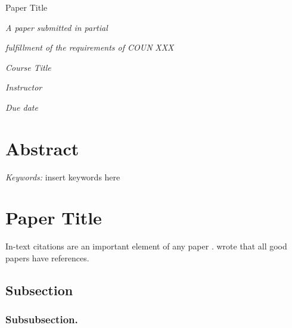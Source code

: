 \documentclass[12pt]{article}
\author{Author}
\title{\papertitle}
\newcommand{\papertitle}{Paper Title}
\newcommand{\coursenumber}{XXX}
\newcommand{\coursetitle}{Course Title}
\newcommand{\instructor}{Instructor}
\newcommand{\duedate}{Due date}
\renewcommand{\maketitle}{
  \begin{center}
    \vspace*{150pt}

    \begin{singlespace}
      \papertitle

      \theauthor
    \end{singlespace}

    \vspace{50pt}

    \textit{A paper submitted in partial}

    \textit{fulfillment of the requirements of COUN}
    \textit{\coursenumber}

    \textit{\coursetitle}

    \textit{\instructor}

    \textit{\duedate}
  \end{center}
}
\begin{document}

\maketitle

\newpage



\section{Abstract}
\setlength{\parindent}{0in}

\lipsum[6]

\setlength{\parindent}{.5in}

\textit{Keywords:} insert keywords here

\newpage



\section{\papertitle}

In-text citations are an important element of any paper \parencite{test_1}.
\textcite{test_2} wrote that all good papers have references.

\subsection{Subsection}

\lipsum[5]

\subsubsection{Subsubsection.}

\lipsum[5]



\newpage

\printbibliography
\end{document}
